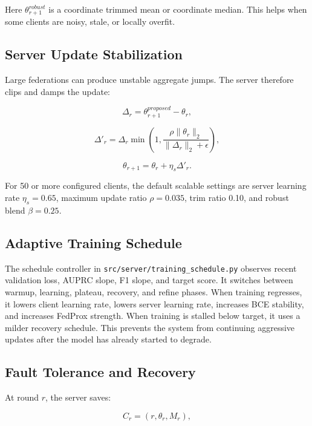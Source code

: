 \documentclass[conference]{IEEEtran}
\begin{document}
Here \(\theta^{robust}_{r+1}\) is a coordinate trimmed mean or coordinate
median. This helps when some clients are noisy, stale, or locally overfit.

\subsection{Server Update Stabilization}

Large federations can produce unstable aggregate jumps. The server therefore
clips and damps the update:

\begin{equation}
\Delta_r=\theta^{proposed}_{r+1}-\theta_r,
\end{equation}

\begin{equation}
\Delta'_r=\Delta_r\min\left(1,
\frac{\rho\|\theta_r\|_2}{\|\Delta_r\|_2+\epsilon}\right),
\end{equation}

\begin{equation}
\theta_{r+1}=\theta_r+\eta_s\Delta'_r.
\end{equation}

For 50 or more configured clients, the default scalable settings are server
learning rate \(\eta_s=0.65\), maximum update ratio \(\rho=0.035\), trim ratio
0.10, and robust blend \(\beta=0.25\).

\subsection{Adaptive Training Schedule}

The schedule controller in \texttt{src/server/training\_schedule.py} observes
recent validation loss, AUPRC slope, F1 slope, and target score. It switches
between warmup, learning, plateau, recovery, and refine phases. When training
regresses, it lowers client learning rate, lowers server learning rate,
increases BCE stability, and increases FedProx strength. When training is
stalled below target, it uses a milder recovery schedule. This prevents the
system from continuing aggressive updates after the model has already started
to degrade.

\subsection{Fault Tolerance and Recovery}

At round \(r\), the server saves:

\begin{equation}
C_r=(r,\theta_r,M_r),
\end{equation}
\end{document}
